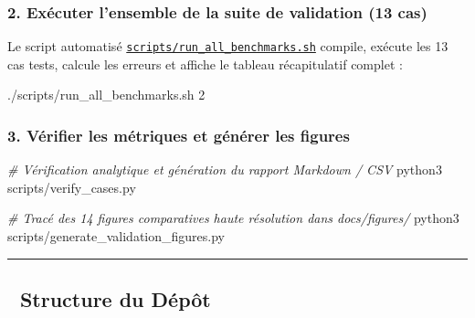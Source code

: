 \documentclass[
  french,
]{article}
\newenvironment{Shaded}{}{}
\newcommand{\CommentTok}[1]{\textcolor[rgb]{0.38,0.63,0.69}{\textit{#1}}}
\newcommand{\ExtensionTok}[1]{#1}
\newcommand{\NormalTok}[1]{#1}
\begin{document}
\subsubsection{2. Exécuter l'ensemble de la suite de validation (13
cas)}\label{exuxe9cuter-lensemble-de-la-suite-de-validation-13-cas}

Le script automatisé
\href{scripts/run_all_benchmarks.sh}{\texttt{scripts/run\_all\_benchmarks.sh}}
compile, exécute les 13 cas tests, calcule les erreurs et affiche le
tableau récapitulatif complet :

\begin{Shaded}
\begin{Highlighting}[]
\ExtensionTok{./scripts/run\_all\_benchmarks.sh}\NormalTok{ 2}
\end{Highlighting}
\end{Shaded}

\subsubsection{3. Vérifier les métriques et générer les
figures}\label{vuxe9rifier-les-muxe9triques-et-guxe9nuxe9rer-les-figures}

\begin{Shaded}
\begin{Highlighting}[]
\CommentTok{\# Vérification analytique et génération du rapport Markdown / CSV}
\ExtensionTok{python3}\NormalTok{ scripts/verify\_cases.py}

\CommentTok{\# Tracé des 14 figures comparatives haute résolution dans docs/figures/}
\ExtensionTok{python3}\NormalTok{ scripts/generate\_validation\_figures.py}
\end{Highlighting}
\end{Shaded}

\begin{center}\rule{0.5\linewidth}{0.5pt}\end{center}

\subsection{📁 Structure du Dépôt}\label{structure-du-duxe9puxf4t}
\end{document}
